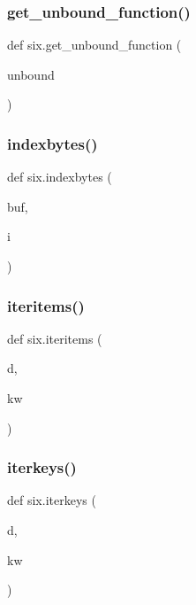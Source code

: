 \subsubsection{\texorpdfstring{get\+\_\+unbound\+\_\+function()}{get\_unbound\_function()}}
{\footnotesize\ttfamily def six.\+get\+\_\+unbound\+\_\+function (\begin{DoxyParamCaption}\item[{}]{unbound }\end{DoxyParamCaption})}

\mbox{\label{namespacesix_adc76be2a046073fafe57d52e5ec84775}} 
\subsubsection{\texorpdfstring{indexbytes()}{indexbytes()}}
{\footnotesize\ttfamily def six.\+indexbytes (\begin{DoxyParamCaption}\item[{}]{buf,  }\item[{}]{i }\end{DoxyParamCaption})}

\mbox{\label{namespacesix_a9577ea8bb177f2b6ad9abf0a289dcccd}} 
\subsubsection{\texorpdfstring{iteritems()}{iteritems()}}
{\footnotesize\ttfamily def six.\+iteritems (\begin{DoxyParamCaption}\item[{}]{d,  }\item[{}]{kw }\end{DoxyParamCaption})}

\mbox{\label{namespacesix_a899a929d0fb30d96272a37df6709f0b0}} 
\subsubsection{\texorpdfstring{iterkeys()}{iterkeys()}}
{\footnotesize\ttfamily def six.\+iterkeys (\begin{DoxyParamCaption}\item[{}]{d,  }\item[{}]{kw }\end{DoxyParamCaption})}

